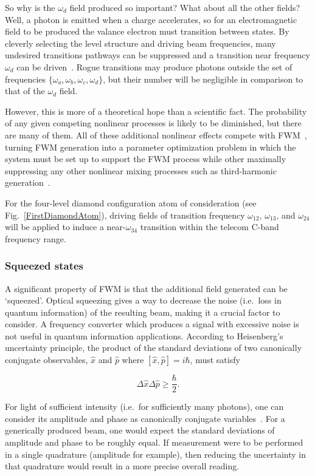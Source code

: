 \documentclass[aps,pra,showpacs,amsmath,amssymb,nofootinbib,longbibliography,superscriptaddress
]{revtex4-1}
\theoremstyle{definition}
\theoremstyle{remark}
\newcommand{\0}{\hat{0}}
\begin{document}
So why is the $\omega_d$ field produced so important? What about all the other fields? Well, a photon is emitted when a charge accelerates, so for an electromagnetic field to be produced the valance electron must transition between states. By cleverly selecting the level structure and driving beam frequencies, many undesired transitions pathways can be suppressed and a transition near frequency $\omega_d$ can be driven~\cite{Nonlinear}. Rogue transitions may produce photons outside the set of frequencies $\{\omega_a, \omega_b, \omega_c, \omega_d\}$, but their number will be negligible in comparison to that of the $\omega_d$ field.

However, this is more of a theoretical hope than a scientific fact. The probability of any given competing nonlinear processes is likely to be diminished, but there are many of them. All of these additional nonlinear effects compete with FWM~\cite{Kim}, turning FWM generation into a parameter optimization problem in which the system must be set up to support the FWM process while other maximally suppressing any other nonlinear mixing processes such as third-harmonic generation~\cite{Agarwal}.

For the four-level diamond configuration atom of consideration (see Fig.~\ref{FirstDiamondAtom}), driving fields of transition frequency $\omega_{12}$, $\omega_{13}$, and $\omega_{24}$ will be applied to induce a near-$\omega_{34}$ transition within the telecom C-band frequency range.


\subsubsection{Squeezed states}

A significant property of FWM is that the additional field generated can be `squeezed'. Optical squeezing gives a way to decrease the noise (i.e.~loss in quantum information) of the resulting beam, making it a crucial factor to consider. A frequency converter which produces a signal with excessive noise is not useful in quantum information applications. According to Heisenberg's uncertainty principle, the product of the standard deviations of two canonically conjugate observables, $\hat{x}$ and $\hat{p}$ where $[\hat{x}, \hat{p}] = i\hbar$, must satisfy

\begin{equation}
    \Delta \hat{x} \Delta \hat{p} \geq \frac{\hbar}{2}.
\end{equation}

For light of sufficient intensity (i.e.~for sufficiently many photons), one can consider its amplitude and phase as canonically conjugate variables~\cite{Slusher}. For a generically produced beam, one would expect the standard deviations of amplitude and phase to be roughly equal. If measurement were to be performed in a single quadrature (amplitude for example), then reducing the uncertainty in that quadrature would result in a more precise overall reading.
\end{document}
